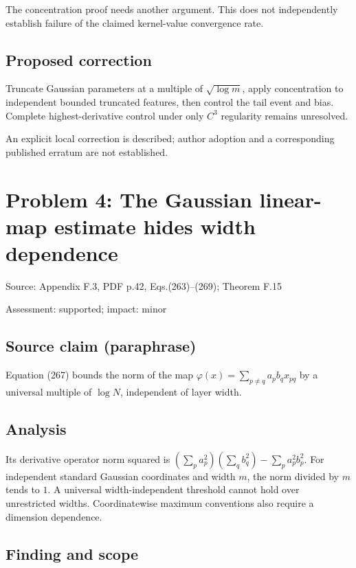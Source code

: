 \documentclass[11pt]{article}
\begin{document}
The concentration proof needs another argument. This does not independently establish failure of the claimed kernel-value convergence rate.

\subsection*{Proposed correction}

Truncate Gaussian parameters at a multiple of \(\sqrt{\log m}\), apply concentration to independent bounded truncated features, then control the tail event and bias. Complete highest-derivative control under only \(C^3\) regularity remains unresolved.

An explicit local correction is described; author adoption and a corresponding published erratum are not established.

\section*{Problem 4: The Gaussian linear-map estimate hides width dependence}

Source: Appendix F.3, PDF p.42, Eqs.(263)–(269); Theorem F.15

Assessment: supported; impact: minor

\subsection*{Source claim (paraphrase)}

Equation (267) bounds the norm of the map \(\varphi(x)=\sum_{p\ne q}a_pb_qx_{pq}\) by a universal multiple of \(\log N\), independent of layer width.

\subsection*{Analysis}

Its derivative operator norm squared is \((\sum_pa_p^2)(\sum_qb_q^2)-\sum_pa_p^2b_p^2\). For independent standard Gaussian coordinates and width \(m\), the norm divided by \(m\) tends to \(1\). A universal width-independent threshold cannot hold over unrestricted widths. Coordinatewise maximum conventions also require a dimension dependence.

\subsection*{Finding and scope}
\end{document}
